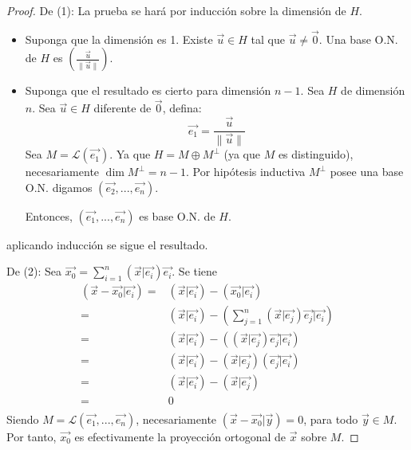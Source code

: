 \documentclass[12pt]{report}
\theoremstyle{largebreak}
\newcommand\norm[1]{\ensuremath{\|#1\|}}
\newcommand\pint[2]{\ensuremath{\left(#1\big| #2\right)}}
\begin{document}
    \begin{proof}
        De (1): La prueba se hará por inducción sobre la dimensión de $H$.
        \begin{itemize}
            \item Suponga que la dimensión es 1. Existe $\vec{u}\in H$ tal que $\vec{u}\neq\vec{0}$. Una base O.N. de $H$ es $(\frac{\vec{u}}{\norm{\vec{u}}})$.
            \item Suponga que el resultado es cierto para dimensión $n-1$. Sea $H$ de dimensión $n$. Sea $\vec{u}\in H$ diferente de $\vec{0}$, defina:
            \begin{equation*}
                \vec{e_1}=\frac{\vec{u}}{\norm{\vec{u}}}
            \end{equation*}
            Sea $M=\mathcal{L}(\vec{e_1})$. Ya que $H=M\oplus M^\perp$ (ya que $M$ es distinguido), necesariamente $\dim M^\perp = n-1$. Por hipótesis inductiva $M^\perp$ posee una base O.N. digamos $(\vec{e_2},...,\vec{e_n})$.
            
            Entonces, $(\vec{e_1},...,\vec{e_n})$ es base O.N. de $H$.
        \end{itemize}
        aplicando inducción se sigue el resultado.

        De (2): Sea $\vec{x_0}=\sum_{ i=1}^{n}\pint{\vec{x}}{\vec{e_i}}\vec{e_i}$. Se tiene
        \begin{equation*}
            \begin{split}
                \pint{\vec{x}-\vec{x_0}}{\vec{e_i}}=&\pint{\vec{x}}{\vec{e_i}}-\pint{\vec{x_0}}{\vec{e_i}} \\
                =&\pint{\vec{x}}{\vec{e_i}}-\pint{\sum_{ j=1}^{n}\pint{\vec{x}}{\vec{e_j}}\vec{e_j}}{\vec{e_i}} \\
                =&\pint{\vec{x}}{\vec{e_i}}-\pint{\pint{\vec{x}}{\vec{e_j}}\vec{e_j}}{\vec{e_i}} \\
                =&\pint{\vec{x}}{\vec{e_i}}-\pint{\vec{x}}{\vec{e_j}}\pint{\vec{e_j}}{\vec{e_i}} \\
                =&\pint{\vec{x}}{\vec{e_i}}-\pint{\vec{x}}{\vec{e_j}}\\
                =&0\\
            \end{split}
        \end{equation*}
        Siendo $M=\mathcal{L}(\vec{e_1},...,\vec{e_n})$, necesariamente $\pint{\vec{x}-\vec{x_0}}{\vec{y}}=0$, para todo $\vec{y}\in M$. Por tanto, $\vec{x_0}$ es efectivamente la proyección ortogonal de $\vec{x}$ sobre $M$.
    \end{proof}
\end{document}
